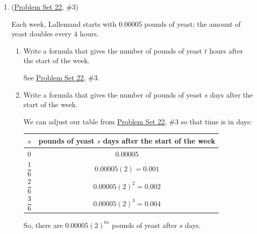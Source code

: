 \documentclass{article}
\begin{document}
\begin{enumerate}
\begin{enumerate}
  \end{enumerate}

\item  (\href{https://people.math.harvard.edu/~jjchen/mathma/docs/homework/PS22.html}{Problem Set 22}, {{\#3}})

  Each week, Lallemand starts with 0.00005 pounds of yeast; the amount of yeast doubles every 4 hours.

  \begin{enumerate}
  \item


    \begin{problem}[\vfill]
      Write a formula that gives the number of pounds of yeast $t$ hours after the start of the week. 
    \end{problem}
    
    \begin{solution}
      See \href{https://people.math.harvard.edu/~jjchen/mathma/docs/homework/PS22.html}{Problem Set 22}, {{\#3}}.
    \end{solution}

  \item


    \begin{problem}[\vfill]
      Write a formula that gives the number of pounds of yeast $s$ days
      after the start of the week.
    \end{problem}

    \begin{solution}
      We can adjust our table from \href{https://people.math.harvard.edu/~jjchen/mathma/docs/homework/PS22.html}{Problem Set 22}, {{\#3}} so that time is in days:
      \begin{center}
        \begin{tabular}{c | c}
          $s$ & pounds of yeast $s$ days after the start of the week \\
          \hline
          0 & $0.00005$ \\
          $\dfrac{1}{6}$ & $0.00005 (2) = 0.001$ \\
          $\dfrac{2}{6}$ & $0.00005 (2)^2 = 0.002$ \\
          $\dfrac{3}{6}$ & $0.00005 (2)^3 = 0.004$ 
        \end{tabular}
      \end{center}
      So, there are $\boxed{0.00005 (2)^{6s}}$ pounds of yeast after $s$ days. 
    \end{solution}


\end{enumerate}
\end{enumerate}
\end{document}
